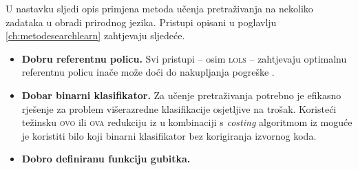 U nastavku sljedi opis primjena metoda učenja pretraživanja na nekoliko zadataka
u obradi prirodnog jezika. Pristupi opisani u poglavlju
\ref{ch:metodesearchlearn} zahtjevaju sljedeće.

\begin{itemize}
\item \textbf{Dobru referentnu policu.} Svi pristupi -- osim \textsc{lols} --
zahtjevaju optimalnu referentnu policu inače može doći do nakupljanja pogreške
.
\item \textbf{Dobar binarni klasifikator.} Za učenje pretraživanja potrebno je
efikasno rješenje za problem višerazredne klasifikacije osjetljive na trošak.
Koristeći težinsku \textsc{ovo} ili \textsc{ova}  redukciju iz \citep{beygelzimer2005weighted,
beygelzimer2005error} u kombinaciji s \textit{costing} algoritmom iz
\citep{zadrozny2003cost} moguće je koristiti bilo koji binarni klasifikator bez
korigiranja izvornog koda.
\item \textbf{Dobro definiranu funkciju gubitka.}
\end{itemize}
